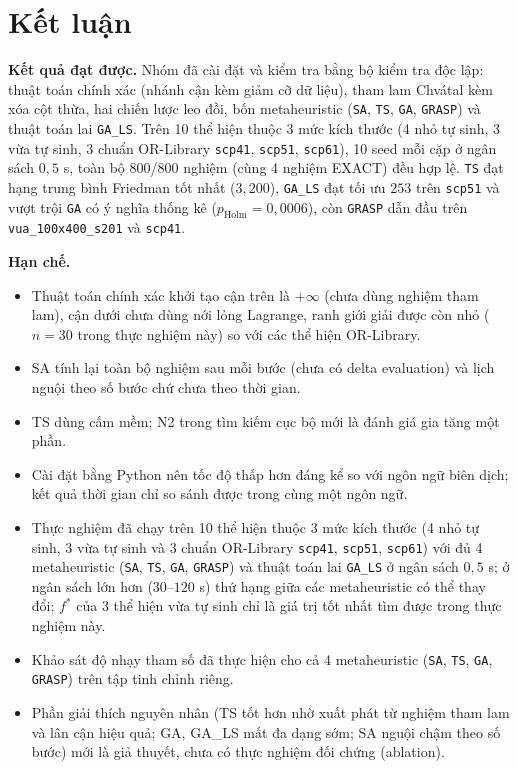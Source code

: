 \documentclass[a4paper,12pt]{article}
\begin{document}
\section{Kết luận}
\textbf{Kết quả đạt được.} Nhóm đã cài đặt và kiểm tra bằng bộ kiểm tra độc lập: thuật toán chính xác (nhánh cận kèm giảm cỡ dữ liệu), tham lam Chvátal kèm xóa cột thừa, hai chiến lược leo đồi, bốn metaheuristic (\texttt{SA}, \texttt{TS}, \texttt{GA}, \texttt{GRASP}) và thuật toán lai \texttt{GA\_LS}. Trên 10 thể hiện thuộc 3 mức kích thước (4 nhỏ tự sinh, 3 vừa tự sinh, 3 chuẩn OR-Library \texttt{scp41}, \texttt{scp51}, \texttt{scp61}), 10 seed mỗi cặp ở ngân sách $0{,}5$ s, toàn bộ 800/800 nghiệm (cùng 4 nghiệm EXACT) đều hợp lệ. \texttt{TS} đạt hạng trung bình Friedman tốt nhất ($3{,}200$), \texttt{GA\_LS} đạt tối ưu $253$ trên \texttt{scp51} và vượt trội \texttt{GA} có ý nghĩa thống kê ($p_{\text{Holm}}=0{,}0006$), còn \texttt{GRASP} dẫn đầu trên \texttt{vua\_100x400\_s201} và \texttt{scp41}.

\textbf{Hạn chế.}
\begin{itemize}
\item Thuật toán chính xác khởi tạo cận trên là $+\infty$ (chưa dùng nghiệm tham lam), cận dưới chưa dùng nới lỏng Lagrange, ranh giới giải được còn nhỏ ($n=30$ trong thực nghiệm này) so với các thể hiện OR-Library.
\item SA tính lại toàn bộ nghiệm sau mỗi bước (chưa có delta evaluation) và lịch nguội theo số bước chứ chưa theo thời gian.
\item TS dùng cấm mềm; N2 trong tìm kiếm cục bộ mới là đánh giá gia tăng một phần.
\item Cài đặt bằng Python nên tốc độ thấp hơn đáng kể so với ngôn ngữ biên dịch; kết quả thời gian chỉ so sánh được trong cùng một ngôn ngữ.
\item Thực nghiệm đã chạy trên 10 thể hiện thuộc 3 mức kích thước (4 nhỏ tự sinh, 3 vừa tự sinh và 3 chuẩn OR-Library \texttt{scp41}, \texttt{scp51}, \texttt{scp61}) với đủ 4 metaheuristic (\texttt{SA}, \texttt{TS}, \texttt{GA}, \texttt{GRASP}) và thuật toán lai \texttt{GA\_LS} ở ngân sách $0{,}5$ s; ở ngân sách lớn hơn ($30$--$120$ s) thứ hạng giữa các metaheuristic có thể thay đổi; $f^*$ của 3 thể hiện vừa tự sinh chỉ là giá trị tốt nhất tìm được trong thực nghiệm này.
\item Khảo sát độ nhạy tham số đã thực hiện cho cả 4 metaheuristic (\texttt{SA}, \texttt{TS}, \texttt{GA}, \texttt{GRASP}) trên tập tinh chỉnh riêng.
\item Phần giải thích nguyên nhân (TS tốt hơn nhờ xuất phát từ nghiệm tham lam và lân cận hiệu quả; GA, GA\_LS mất đa dạng sớm; SA nguội chậm theo số bước) mới là giả thuyết, chưa có thực nghiệm đối chứng (ablation).
\end{itemize}
\end{document}
